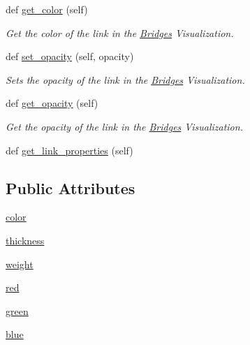 \begin{DoxyCompactItemize}
def \hyperlink{class_link_visualizer_1_1_link_visualizer_a254c9edbc1a75c5f99391ef5f9beb79f}{get\+\_\+color} (self)
\begin{DoxyCompactList}\small\item\em Get the color of the link in the \hyperlink{namespace_bridges}{Bridges} Visualization. \end{DoxyCompactList}\item 
def \hyperlink{class_link_visualizer_1_1_link_visualizer_ac596836b6b514935d6b570168a650ecf}{set\+\_\+opacity} (self, opacity)
\begin{DoxyCompactList}\small\item\em Sets the opacity of the link in the \hyperlink{namespace_bridges}{Bridges} Visualization. \end{DoxyCompactList}\item 
def \hyperlink{class_link_visualizer_1_1_link_visualizer_a62474acb1e264374ddc480831c840437}{get\+\_\+opacity} (self)
\begin{DoxyCompactList}\small\item\em Get the opacity of the link in the \hyperlink{namespace_bridges}{Bridges} Visualization. \end{DoxyCompactList}\item 
def \hyperlink{class_link_visualizer_1_1_link_visualizer_ac335facce0d2d03ecdfa66ddf8505c1b}{get\+\_\+link\+\_\+properties} (self)
\end{DoxyCompactItemize}
\subsection*{Public Attributes}
\begin{DoxyCompactItemize}
\item 
\hyperlink{class_link_visualizer_1_1_link_visualizer_a534ed7a306063db52d7b668542f1ebb5}{color}
\item 
\hyperlink{class_link_visualizer_1_1_link_visualizer_af43b27883cc7b1427ad929b8f9717af9}{thickness}
\item 
\hyperlink{class_link_visualizer_1_1_link_visualizer_ab3663261fc964c75d45b76803384d933}{weight}
\item 
\hyperlink{class_link_visualizer_1_1_link_visualizer_a2f23008a3cfa731f1c2ae70e0d84c86b}{red}
\item 
\hyperlink{class_link_visualizer_1_1_link_visualizer_ab6e44bd36d18e8286fbcaa4f8b557e5d}{green}
\item 
\hyperlink{class_link_visualizer_1_1_link_visualizer_a371f7ab740dc13fdb1cf45b09e09f2cb}{blue}
\end{DoxyCompactItemize}
